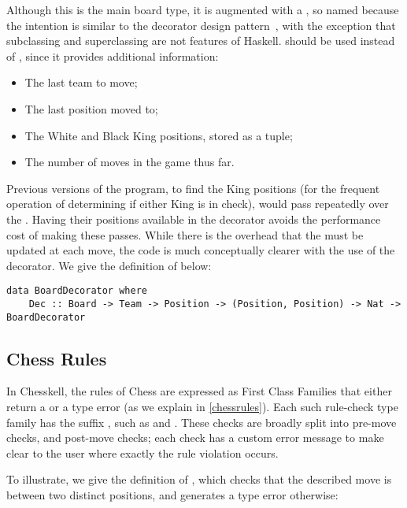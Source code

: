 Although this is the main board type, it is augmented with a , so named because the intention is similar to the decorator design pattern~\cite{decorator}, with the exception that subclassing and superclassing are not features of Haskell.  should be used instead of , since it provides additional information:

\begin{itemize}
    \item The last team to move;
    \item The last position moved to;
    \item The White and Black King positions, stored as a tuple;
    \item The number of moves in the game thus far.
\end{itemize}

Previous versions of the program, to find the King positions (for the frequent operation of determining if either King is in check), would pass repeatedly over the . Having their positions available in the decorator avoids the performance cost of making these passes. While there is the overhead that the  must be updated at each move, the code is much conceptually clearer with the use of the decorator. We give the definition of  below:

\begin{lstlisting}
data BoardDecorator where
    Dec :: Board -> Team -> Position -> (Position, Position) -> Nat -> BoardDecorator
\end{lstlisting}

\subsection{Chess Rules}

In Chesskell, the rules of Chess are expressed as First Class Families that either return a  or a type error (as we explain in \cref{chessrules}). Each such rule-check type family has the suffix , such as  and . These checks are broadly split into pre-move checks, and post-move checks; each check has a custom error message to make clear to the user where exactly the rule violation occurs.

To illustrate, we give the definition of , which checks that the described move is between two distinct positions, and generates a type error otherwise:

